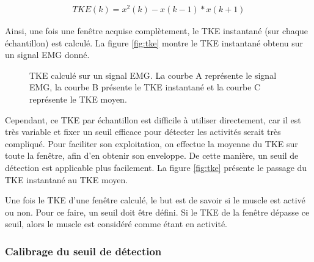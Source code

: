 \documentclass[letterpaper, twoside, 12pt, memoire, creativecommons, hyperref]{thETS}
\begin{document}
\begin{align}\label{eq:tke}
   TKE(k) = x^2(k) - x(k-1)*x(k+1) 
\end{align}

Ainsi, une fois une fenêtre acquise complètement, le TKE instantané (sur chaque échantillon) est calculé. La figure \ref{fig:tke} montre le TKE instantané obtenu sur un signal EMG donné.

\begin{figure}
	\centering
	\caption{TKE calculé sur un signal EMG. La courbe A représente le signal EMG, la courbe B présente le TKE instantané et la courbe C représente le TKE moyen.}
	\label{fig:tkeinstant}
\end{figure}

Cependant, ce TKE par échantillon est difficile à utiliser directement, car il est très variable et fixer un seuil efficace pour détecter les activités serait très compliqué. Pour faciliter son exploitation, on effectue la moyenne du TKE sur toute la fenêtre, afin d'en obtenir son enveloppe. De cette manière, un seuil de détection est applicable plus facilement. La figure \ref{fig:tke} présente le passage du TKE instantané au TKE moyen.

Une fois le TKE d'une fenêtre calculé, le but est de savoir si le muscle est activé ou non. Pour ce faire, un seuil doit être défini. Si le TKE de la fenêtre dépasse ce seuil, alors le muscle est considéré comme étant en activité.

\subsubsection{Calibrage du seuil de détection}
\end{document}
